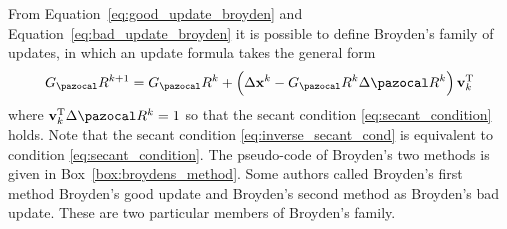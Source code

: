 From Equation~\eqref{eq:good_update_broyden} and Equation~\eqref{eq:bad_update_broyden} it is possible to define Broyden's family of updates, in which an update formula takes the general form
\begin{equation}
G_\pazocal R^{k+1}=G_\pazocal R^{k}+\left(\Delta \mathbf x^{k}-G_\pazocal R^{k} \Delta \pazocal R^{k}\right) \mathbf v_{k}^{\mathrm{T}}
\end{equation}
where \(\mathbf v_{k}^{\mathrm{T}} \Delta \pazocal R^{k}=1\) so that the secant condition \eqref{eq:secant_condition} holds.
Note that the secant condition \eqref{eq:inverse_secant_cond} is equivalent to condition \eqref{eq:secant_condition}.
The pseudo-code of Broyden's two methods is given in Box~\ref{box:broydens_method}.
Some authors called Broyden's first method Broyden's good update and Broyden's second method as Broyden's bad update.
These are two particular members of Broyden's family.

